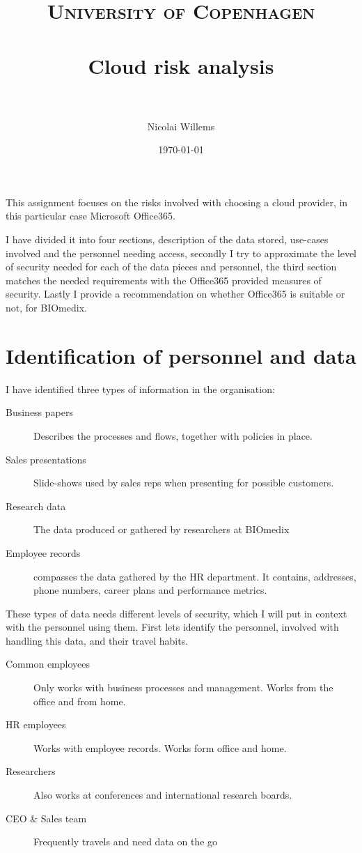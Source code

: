 \documentclass[paper=a4, fontsize=11pt]{scrartcl} %
\title{	
\normalfont \normalsize 
\textsc{University of Copenhagen} \\ [25pt] %
\horrule{0.5pt} \\[0.4cm] %
\huge Cloud risk analysis\\ %
\horrule{2pt} \\[0.5cm] %
}
\author{Nicolai Willems} %
\date{\normalsize\today} %
\numberwithin{equation}{section} %
\numberwithin{figure}{section} %
\numberwithin{table}{section} %
\begin{document}
\maketitle %


This assignment focuses on the risks involved with choosing a cloud provider, in
this particular case Microsoft Office365.

I have divided it into four sections, description of the data stored,
use-cases involved and the personnel needing access, secondly I try to 
approximate the level of security needed for each of the data pieces and 
personnel, the third section matches the needed requirements with the Office365
provided measures of security. Lastly I provide a recommendation on whether
Office365 is suitable or not, for BIOmedix.

\section{Identification of personnel and data}
I have identified three types of information in the organisation:

\begin{description}
\item[Business papers] Describes the processes and flows, together with
    policies in place.
\item[Sales presentations] Slide-shows used by sales reps when presenting for
    possible customers.
\item[Research data] The data produced or gathered by researchers at BIOmedix
\item[Employee records] compasses the data gathered by the HR department. It
    contains, addresses, phone numbers, career plans and performance metrics.
\end{description}

These types of data needs different levels of security, which I will put in
context with the personnel using them. First lets identify the personnel,
involved with handling this data, and their travel habits.

\begin{description}
\item[Common employees] Only works with business processes and management. Works
    from the office and from home.
\item[HR employees] Works with employee records. Works form office and home.
\item[Researchers] Also works at conferences and international research boards.
\item[CEO \& Sales team] Frequently travels and need data on the go
\end{description}
\end{document}
